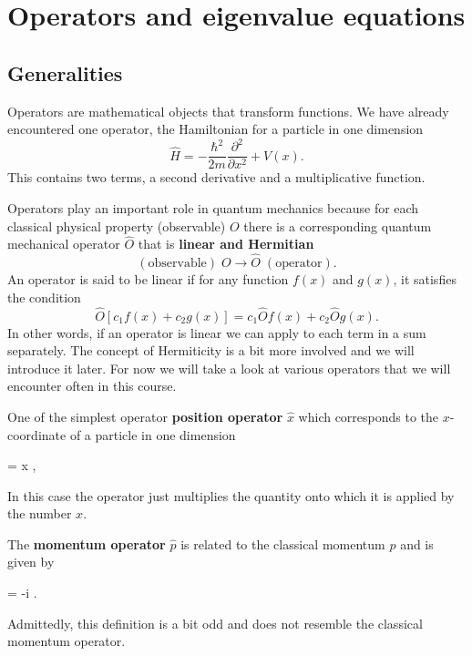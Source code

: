 \documentclass[../Main/chem331-notes.tex]{subfiles}
\begin{document}
\setcounter{section}{4}

\section{Operators and eigenvalue equations}
\subsection{Generalities}
Operators are mathematical objects that transform functions.
We have already encountered one operator, the Hamiltonian for a particle in one dimension
\begin{equation}
\hat{H} =  - \frac{\hbar^2}{2 m} \frac{\partial^2}{\partial x^2} + V(x).
\end{equation}
This contains two terms, a second derivative and a multiplicative function.

Operators play an important role in quantum mechanics because for each classical physical property (observable) $O$ there is a corresponding quantum mechanical operator $\hat{O}$ that is \textbf{linear and Hermitian}
\begin{equation}
(\text{observable}) \; O \rightarrow \hat{O} \; (\text{operator}).
\end{equation}
An operator is said to be linear if for any function $f(x)$ and $g(x)$, it satisfies the condition
\begin{equation}
\hat{O}[c_1 f(x) + c_2 g(x)] = c_1 \hat{O} f(x) +  c_2 \hat{O} g(x).
\end{equation}
In other words, if an operator is linear we can apply to each term in a sum separately.
The concept of Hermiticity is a bit more involved and we will introduce it later. For now we will take a look at various operators that we will encounter often in this course.

One of the simplest operator \textbf{position operator} $\hat{x}$ which corresponds to the $x$-coordinate of a particle in one dimension
\begin{iequation}
 = x ,
\end{iequation}
In this case the operator just multiplies the quantity onto which it is applied by the number $x$.

The \textbf{momentum operator} $\hat{p}$ is related to the classical momentum $p$ and is given by
\begin{iequation}
 = -i \hbar {}.
\end{iequation}
Admittedly, this definition is a bit odd and does not resemble the classical momentum operator.
\end{document}
